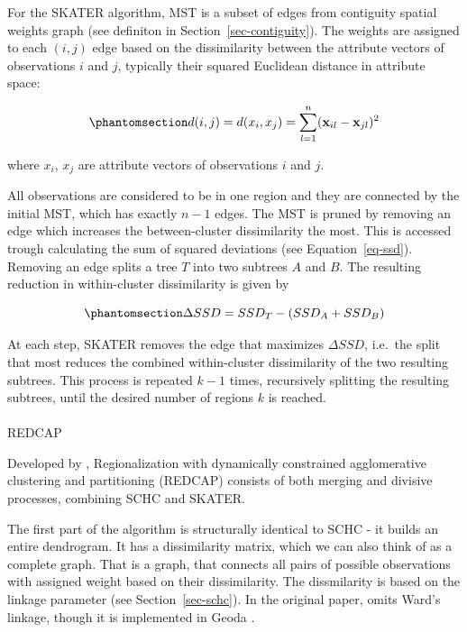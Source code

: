 \documentclass[
  english,
  12pt,
  a4paper,
]{article}
\makeatletter
\let\oldparagraph\paragraph
\renewcommand{\paragraph}{
    \@ifstar
      \xxxParagraphStar
      \xxxParagraphNoStar
  }
\newcommand{\xxxParagraphStar}[1]{\oldparagraph*{#1}\mbox{}}
\newcommand{\xxxParagraphNoStar}[1]{\oldparagraph{#1}\mbox{}}
\makeatother
\begin{document}
For the SKATER algorithm, MST is a subset of edges from contiguity
spatial weights graph (see definiton in Section~\ref{sec-contiguity}).
The weights are assigned to each \((i,j)\) edge based on the
dissimilarity between the attribute vectors of observations \(i\) and
\(j\), typically their squared Euclidean distance in attribute space:

\begin{equation}\phantomsection\label{eq-euclidean_distance_skater}{d(i, j) = d(x_i, x_j) = \sum_{l=1}^{n} (\mathbf{x}_{il} - \mathbf{x}_{jl})^2}\end{equation}

where \(x_i\), \(x_j\) are attribute vectors of observations \(i\) and
\(j\).

All observations are considered to be in one region and they are
connected by the initial MST, which has exactly \(n-1\) edges. The MST
is pruned by removing an edge which increases the between-cluster
dissimilarity the most. This is accessed trough calculating the sum of
squared deviations (see Equation~\ref{eq-ssd}). Removing an edge splits
a tree \(T\) into two subtrees \(A\) and \(B\). The resulting reduction
in within-cluster dissimilarity is given by

\begin{equation}\phantomsection\label{eq-ssd_skater}{\Delta SSD=SSD_T-(SSD_A+SSD_B)}\end{equation}

At each step, SKATER removes the edge that maximizes \(\Delta SSD\),
i.e.~the split that most reduces the combined within-cluster
dissimilarity of the two resulting subtrees. This process is repeated
\(k-1\) times, recursively splitting the resulting subtrees, until the
desired number of regions \(k\) is reached.

\paragraph{REDCAP}\label{redcap}

Developed by \citet{guo2008}, Regionalization with dynamically
constrained agglomerative clustering and partitioning (REDCAP) consists
of both merging and divisive processes, combining SCHC and SKATER.

The first part of the algorithm is structurally identical to SCHC - it
builds an entire dendrogram. It has a dissimilarity matrix, which we can
also think of as a complete graph. That is a graph, that connects all
pairs of possible observations with assigned weight based on their
dissimilarity. The dissmilarity is based on the linkage parameter (see
Section~\ref{sec-schc}). In the original paper, \citet{guo2008} omits
Ward's linkage, though it is implemented in Geoda
\citep{anselin2006GeoDa}.
\end{document}
